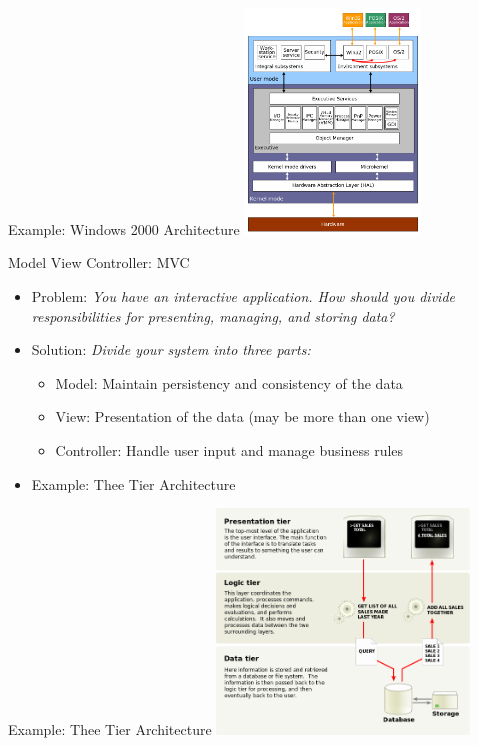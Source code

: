 \documentclass[10pt,t,a4paper]{beamer}
\begin{document}
\begin{frame}[label={sec:orgheadline4}]{Example: Windows 2000 Architecture}
\includegraphics[height=6cm]{./IWindows_2000_architecture.png}
\end{frame}
\begin{frame}[label={sec:orgheadline5}]{Model View Controller: MVC}
\begin{itemize}
\item Problem: \emph{You have an interactive application. How should you divide responsibilities for \alert{presenting}, \alert{managing}, and \alert{storing} data?}
\item Solution: \emph{Divide your system into three parts:}
\begin{itemize}
\item \alert{Model}: Maintain persistency and consistency of the data
\item \alert{View}: Presentation of the data (may be more than one view)
\item \alert{Controller}: Handle user input and manage business rules
\end{itemize}
\item Example: Thee Tier Architecture
\end{itemize}
\end{frame}
\begin{frame}[label={sec:orgheadline6}]{Example: Thee Tier Architecture}
\includegraphics[height=6cm]{./IThreeTierArchitecture.png}
\end{frame}
\end{document}

